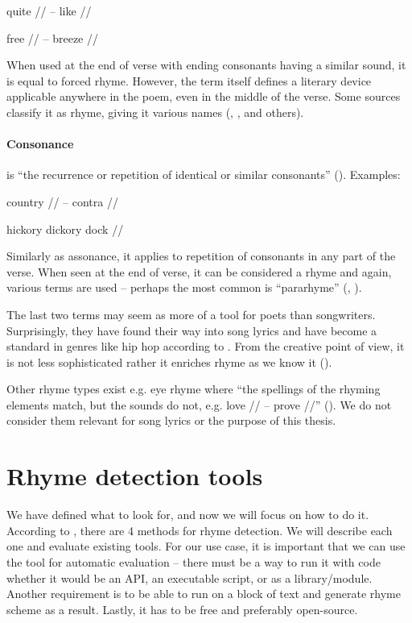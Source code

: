 quite // -- like //

free // -- breeze //

\noindent When used at the end of verse with ending consonants having a similar sound, it is equal to forced rhyme. However, the term itself defines a literary device applicable anywhere in the poem, even in the middle of the verse. Some sources classify it as rhyme, giving it various names (\cite{vanphonological}, \cite{bergman2017litcharts}, and others).

\paragraph{Consonance} is ``the recurrence or repetition of identical or similar consonants'' (\cite{britannica}). Examples: 

country // -- contra //

hickory dickory dock //

\noindent Similarly as assonance, it applies to repetition of consonants in any part of the verse. When seen at the end of verse, it can be considered a rhyme and again, various terms are used -- perhaps the most common is ``pararhyme'' (\cite{britannica}, \cite{oxforddict2008literary}).
\newline

The last two terms may seem as more of a tool for poets than songwriters. Surprisingly, they have found their way into song lyrics and have become a standard in genres like hip hop according to \cite{vanphonological}. From the creative point of view, it is not less sophisticated rather it enriches rhyme as we know it (\cite{brogan2016poeticterms}).


Other rhyme types exist e.g. eye rhyme where ``the spellings of the rhyming elements match, but the sounds do not, e.g. love // -- prove //'' (\cite{oxforddict2008literary}). We do not consider them relevant for song lyrics or the purpose of this thesis.


\section{Rhyme detection tools}\label{rhyme_detection_tools}
We have defined what to look for, and now we will focus on how to do it. According to \cite{plechac2017presentation}, there are 4 methods for rhyme detection. We will describe each one and evaluate existing tools. For our use case, it is important that we can use the tool for automatic evaluation -- there must be a way to run it with code whether it would be an API,  an executable script, or as a library/module.
Another requirement is  to be able to run on a block of text and generate rhyme scheme as a result. Lastly, it has to be free and preferably open-source.

